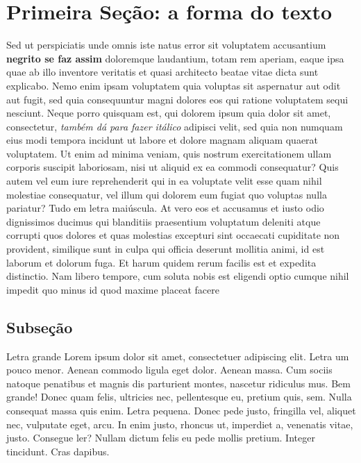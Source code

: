 \documentclass[pdftex,12pt,a4paper]{article} %
\begin{document}
\pagestyle{empty}

\tableofcontents %

\listoffigures %

\listoftables %

\clearpage
\newpage
\section{Primeira Seção: a forma do texto}
\label{psecao}

Sed ut perspiciatis unde omnis iste natus error sit voluptatem
accusantium {\bf negrito se faz assim} doloremque laudantium, totam
rem aperiam, eaque ipsa quae ab illo inventore veritatis et quasi
architecto beatae vitae dicta sunt explicabo. Nemo enim ipsam
voluptatem quia voluptas sit aspernatur aut odit aut fugit, sed quia
consequuntur magni dolores eos qui ratione voluptatem sequi
nesciunt. Neque porro quisquam est, qui dolorem ipsum quia dolor sit
amet, consectetur, {\em também dá para fazer itálico} adipisci velit,
sed quia non numquam eius modi tempora incidunt ut labore et dolore
magnam aliquam quaerat voluptatem. Ut enim ad minima veniam, quis
nostrum exercitationem ullam corporis suscipit laboriosam, nisi ut
aliquid ex ea commodi consequatur? Quis autem vel eum iure
reprehenderit qui in ea voluptate velit esse quam nihil molestiae
consequatur, vel illum qui dolorem eum fugiat quo voluptas nulla
pariatur? {\sc Tudo em letra maiúscula}. At vero eos et accusamus et
iusto odio dignissimos ducimus qui blanditiis praesentium voluptatum
deleniti atque corrupti quos dolores et quas molestias excepturi sint
occaecati cupiditate non provident, similique sunt in culpa qui
officia deserunt mollitia animi, id est laborum et dolorum fuga. Et
harum quidem rerum facilis est et expedita distinctio. Nam libero
tempore, cum soluta nobis est eligendi optio cumque nihil impedit quo
minus id quod maxime placeat facere

\subsection{Subseção}

{\Large Letra grande} Lorem ipsum dolor sit amet, consectetuer
adipiscing elit. {\large Letra um pouco menor}. Aenean commodo ligula
eget dolor. Aenean massa. Cum sociis natoque penatibus et magnis dis
parturient montes, nascetur ridiculus mus. {\LARGE Bem grande!} Donec
quam felis, ultricies nec, pellentesque eu, pretium quis, sem. Nulla
consequat massa quis enim. {\small Letra pequena.} Donec pede justo,
fringilla vel, aliquet nec, vulputate eget, arcu. In enim justo,
rhoncus ut, imperdiet a, venenatis vitae, justo. {\tiny Consegue ler?}
Nullam dictum felis eu pede mollis pretium. Integer tincidunt. Cras
dapibus.
\end{document}
